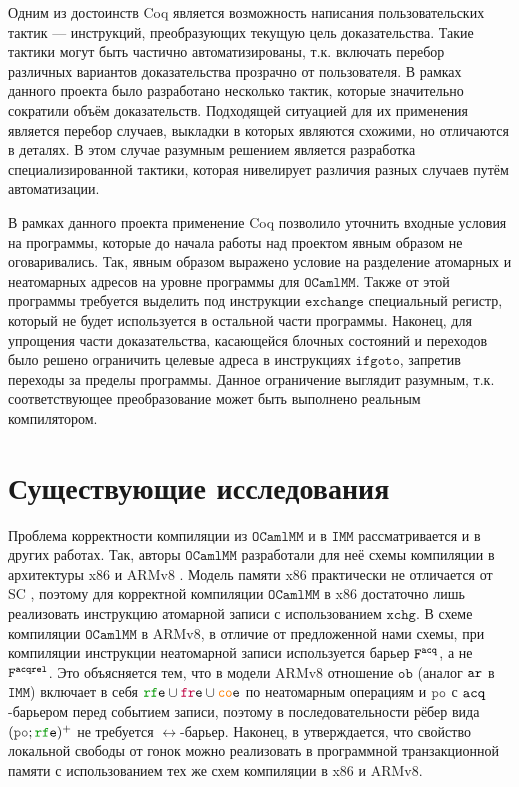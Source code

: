 \documentclass[14pt]{matmex-diploma-custom}
\newcommand{\IMM}{\mathtt{IMM}}
\newcommand{\OMM}{\mathtt{OCaml}\allowbreak \mathtt{MM}}
\begin{document}
Одним из достоинств Coq является возможность написания пользовательских тактик --- инструкций, преобразующих текущую цель доказательства. Такие тактики могут быть частично автоматизированы, т.к. включать перебор различных вариантов доказательства прозрачно от пользователя. В рамках данного проекта было разработано несколько тактик, которые значительно сократили объём доказательств. Подходящей ситуацией для их применения является перебор случаев, выкладки в которых являются схожими, но отличаются в деталях. В этом случае разумным решением является разработка специализированной тактики, которая нивелирует различия разных случаев путём автоматизации.

В рамках данного проекта применение Coq позволило уточнить входные условия на программы, которые до начала работы над проектом явным образом не оговаривались. Так, явным образом выражено условие на разделение атомарных и неатомарных адресов на уровне программы для $\OMM$. Также от этой программы  требуется выделить под инструкции $\mathtt{exchange}$ специальный регистр, который не будет используется в остальной части программы. Наконец, для упрощения части доказательства, касающейся блочных состояний и переходов было решено ограничить целевые адреса в инструкциях $\mathtt{ifgoto}$, запретив переходы за пределы программы. Данное ограничение выглядит разумным, т.к. соответствующее преобразование может быть выполнено реальным компилятором.


\section{Существующие исследования}
\label{related-work}

Проблема корректности компиляции из $\OMM$ и в $\IMM$ рассматривается и в других работах. Так, авторы $\OMM$ \cite{omm} разработали для неё схемы компиляции в архитектуры x86 и ARMv8 \cite{arm}. Модель памяти x86 практически не отличается от SC \cite{x86-reorderings}, поэтому для корректной компиляции $\OMM$ в x86 достаточно лишь реализовать инструкцию атомарной записи с использованием $\mathtt{xchg}$. В схеме компиляции $\OMM$ в ARMv8, в отличие от предложенной нами схемы, при компиляции инструкции неатомарной записи используется барьер ${\mathtt{F}}^{{\mathtt{acq}}}$, а не ${\mathtt{F}}^{{\mathtt{acqrel}}}$. Это объясняется тем, что в модели ARMv8 отношение $\mathtt{ob}$ (аналог $\lAR$ в $\IMM$) включает в себя $\lRFE \cup \lFRE \cup \lCOE$ по неатомарным операциям и $\lPO$ с ${\mathtt{acq}}$-барьером перед событием записи, поэтому в последовательности рёбер вида $(\lPO;\lRFE)^{+}$ не требуется $\rel$-барьер. Наконец, в \cite{omm-stm} утверждается, что свойство локальной свободы от гонок можно реализовать в программной транзакционной памяти с использованием тех же схем компиляции в x86 и ARMv8.
\end{document}
